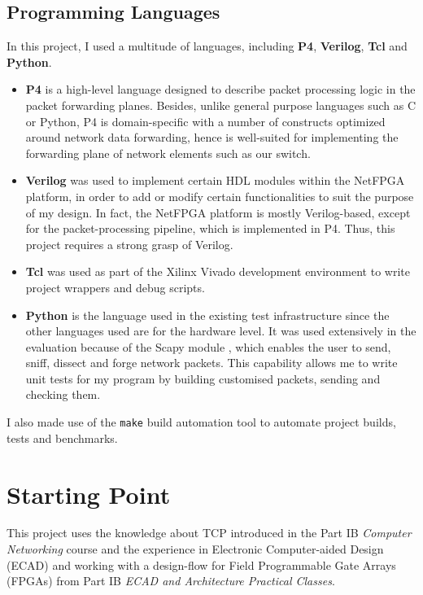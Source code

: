 \subsection{Programming Languages}
In this project, I used a multitude of languages, including \textbf{P4}, \textbf{Verilog}, \textbf{Tcl} and \textbf{Python}.

\begin{itemize}
	\item \textbf{P4} \cite{bosshart2014p4} is a high-level language designed to describe packet processing logic in the packet forwarding planes. Besides, unlike general purpose languages such as C or Python, P4 is domain-specific with a number of constructs optimized around network data forwarding, hence is well-suited for implementing the forwarding plane of network elements such as our switch.
	
	\item \textbf{Verilog} was used to implement certain HDL modules within the NetFPGA platform, in order to add or modify certain functionalities to suit the purpose of my design. In fact, the NetFPGA platform is mostly Verilog-based, except for the packet-processing pipeline, which is implemented in P4. Thus, this project requires a strong grasp of Verilog. 
	
	\item \textbf{Tcl} was used as part of the Xilinx Vivado development environment to write project wrappers and debug scripts.
	
	\item \textbf{Python} is the language used in the existing test infrastructure since the other languages used are for the hardware level. It was used extensively in the evaluation because of the Scapy module \cite{scapy}, which enables the user to send, sniff, dissect and forge network packets. This capability allows me to write unit tests for my program by building customised packets, sending and checking them.
\end{itemize}

I also made use of the \texttt{make} build automation tool to automate project builds, tests and benchmarks.

\section{Starting Point} 
\label{sec:start}
This project uses the knowledge about TCP introduced in the Part IB \textit{Computer Networking} course and the experience in Electronic Computer-aided Design (ECAD) and working with a design-flow for Field Programmable Gate Arrays (FPGAs) from Part IB \textit{ECAD and Architecture Practical Classes}.

